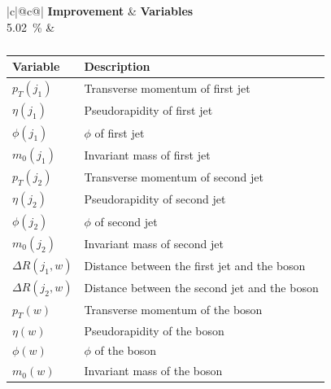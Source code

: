 \begin{table}[h]
    \centering
    \label{tab:app_vars_1}
    \caption{}
    \begin{tabular}{ |c|@{}c@{}| }
        \hline
        \textbf{Improvement} & \textbf{Variables}\\
        \hline
        \SI{5.02}{\%} & 
        \begin{tabular}{ll}
            \hline
            Variable & Description\\
            \hline
            $p_T(j_1)$ & Transverse momentum of first jet\\
            $\eta(j_1)$ & Pseudorapidity of first jet\\
            $\phi(j_1)$ & $\phi$ of first jet\\
            $m_0(j_1)$ & Invariant mass of first jet\\

            $p_T(j_2)$ & Transverse momentum of second jet\\
            $\eta(j_2)$ & Pseudorapidity of second jet\\
            $\phi(j_2)$ & $\phi$ of second jet\\
            $m_0(j_2)$ & Invariant mass of second jet\\

            $\Delta R(j_1, w)$ & Distance between the first jet and the \PWplus boson\\
            $\Delta R(j_2, w)$ & Distance between the second jet and the \PWplus boson\\

            $p_T(w)$ & Transverse momentum of the \PWplus boson\\
            $\eta(w)$ & Pseudorapidity of the \PWplus boson\\
            $\phi(w)$ & $\phi$ of the \PWplus boson\\
            $m_0(w)$ & Invariant mass of the \PWplus boson\\
            \hline
        \end{tabular}\\
        \hline
    \end{tabular}
\end{table}


